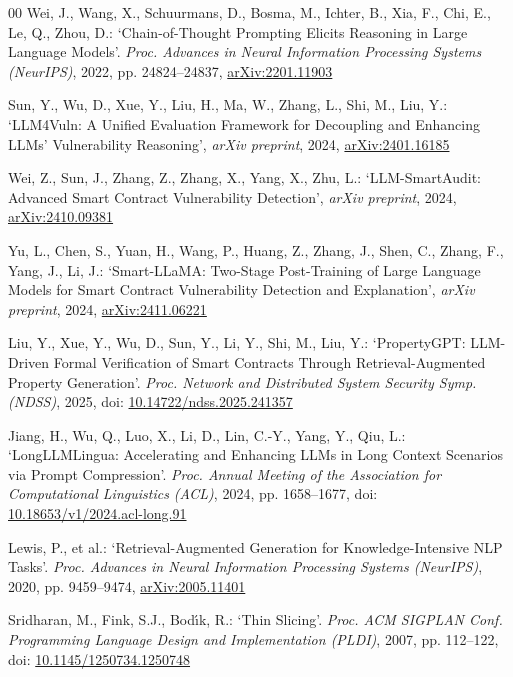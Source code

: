 \documentclass{ieeeaccess}
\begin{document}
\begin{thebibliography}{00}
Wei, J., Wang, X., Schuurmans, D., Bosma, M., Ichter, B., Xia, F., Chi, E., Le, Q., Zhou, D.: `Chain-of-Thought Prompting Elicits Reasoning in Large Language Models'. \textit{Proc. Advances in Neural Information Processing Systems (NeurIPS)}, 2022, pp. 24824--24837, \href{https://arxiv.org/abs/2201.11903}{arXiv:2201.11903}

Sun, Y., Wu, D., Xue, Y., Liu, H., Ma, W., Zhang, L., Shi, M., Liu, Y.: `LLM4Vuln: A Unified Evaluation Framework for Decoupling and Enhancing LLMs' Vulnerability Reasoning', \textit{arXiv preprint}, 2024, \href{https://arxiv.org/abs/2401.16185}{arXiv:2401.16185}

Wei, Z., Sun, J., Zhang, Z., Zhang, X., Yang, X., Zhu, L.: `LLM-SmartAudit: Advanced Smart Contract Vulnerability Detection', \textit{arXiv preprint}, 2024, \href{https://arxiv.org/abs/2410.09381}{arXiv:2410.09381}

Yu, L., Chen, S., Yuan, H., Wang, P., Huang, Z., Zhang, J., Shen, C., Zhang, F., Yang, J., Li, J.: `Smart-LLaMA: Two-Stage Post-Training of Large Language Models for Smart Contract Vulnerability Detection and Explanation', \textit{arXiv preprint}, 2024, \href{https://arxiv.org/abs/2411.06221}{arXiv:2411.06221}

Liu, Y., Xue, Y., Wu, D., Sun, Y., Li, Y., Shi, M., Liu, Y.: `PropertyGPT: LLM-Driven Formal Verification of Smart Contracts Through Retrieval-Augmented Property Generation'. \textit{Proc. Network and Distributed System Security Symp. (NDSS)}, 2025, doi: \href{https://doi.org/10.14722/ndss.2025.241357}{10.14722/ndss.2025.241357}

Jiang, H., Wu, Q., Luo, X., Li, D., Lin, C.-Y., Yang, Y., Qiu, L.: `LongLLMLingua: Accelerating and Enhancing LLMs in Long Context Scenarios via Prompt Compression'. \textit{Proc. Annual Meeting of the Association for Computational Linguistics (ACL)}, 2024, pp. 1658--1677, doi: \href{https://doi.org/10.18653/v1/2024.acl-long.91}{10.18653/v1/2024.acl-long.91}

Lewis, P., et al.: `Retrieval-Augmented Generation for Knowledge-Intensive NLP Tasks'. \textit{Proc. Advances in Neural Information Processing Systems (NeurIPS)}, 2020, pp. 9459--9474, \href{https://arxiv.org/abs/2005.11401}{arXiv:2005.11401}

Sridharan, M., Fink, S.J., Bod\'{\i}k, R.: `Thin Slicing'. \textit{Proc. ACM SIGPLAN Conf. Programming Language Design and Implementation (PLDI)}, 2007, pp. 112--122, doi: \href{https://doi.org/10.1145/1250734.1250748}{10.1145/1250734.1250748}


\end{thebibliography}
\end{document}
